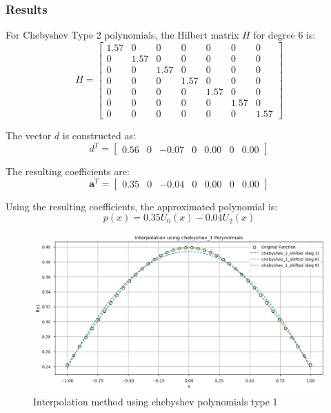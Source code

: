 \documentclass[10pt]{article}
\begin{document}
\subsubsection{Results}


For Chebyshev Type 2 polynomials, the Hilbert matrix \( H \) for degree 6 is:
\[
H = \begin{bmatrix}
1.57 & 0 & 0 & 0 & 0 & 0 & 0 \\
0 & 1.57 & 0 & 0 & 0 & 0 & 0 \\
0 & 0 & 1.57 & 0 & 0 & 0 & 0 \\
0 & 0 & 0 & 1.57 & 0 & 0 & 0 \\
0 & 0 & 0 & 0 & 1.57 & 0 & 0 \\
0 & 0 & 0 & 0 & 0 & 1.57 & 0 \\
0 & 0 & 0 & 0 & 0 & 0 & 1.57
\end{bmatrix}
\]

The vector \( d \) is constructed as:
\[
d^T = \begin{bmatrix}
0.56 & 0 & -0.07 & 0 & 0.00 & 0 & 0.00
\end{bmatrix}
\]

The resulting coefficients are:
\[
\mathbf{a}^T = \begin{bmatrix}
0.35 & 0 & -0.04 & 0 & 0.00 & 0 & 0.00
\end{bmatrix}
\]

Using the resulting coefficients, the approximated polynomial is:
\begin{equation}
p(x) = 0.35 U_0(x) - 0.04 U_2(x)
\end{equation}




\begin{figure}[H]
    \centering
    \includegraphics[width=\imagewidth\textwidth]{figures/02_interpolation/interpolation_method_chebyshev_1_shifted.png}
    \caption{Interpolation method using chebyshev polynomials type 1}
\end{figure}
\end{document}
